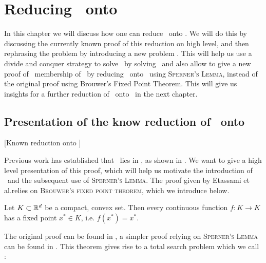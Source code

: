 \setchapterpreamble[u]{\margintoc}
\chapter{Reducing \Tarski\ onto \PPAD}

In this chapter we will discuss how one can reduce \Tarski\ onto \PPAD. We will do this by discussing the currently known proof of this reduction on high level, and then rephrasing the problem by introducing a new problem \Tarskistar. This will help us use a divide and conquer strategy to solve \Tarski\ by solving \Tarskistar\ and also allow to give a new proof of \PPAD\ membership of \Tarski\ by reducing \Tarskistar\ onto \PPAD\ using \textsc{Sperner's Lemma}, instead of the original proof using Brouwer's Fixed Point Theorem. This will give us insights for a further reduction of \Tarskistar\ onto \EOPL\ in the next chapter.

\section{Presentation of the know reduction of \Tarski\ onto \PPAD}[Known reduction onto \PPAD]

Previous work has established that \Tarski\ lies in \PPAD, as shown in . We want to give a high level presentation of this proof, which will help us motivate the introduction of \Tarskistar\ and the subsequent use of \textsc{Sperner's Lemma}. The proof given by Etassami et al.\@ relies on \textsc{Brouwer's fixed point theorem}, which we introduce below.

\begin{theorem}
    Let $K \subset \mathbb{R}^d$ be a compact, convex set. Then every continuous function $f : K \rightarrow K$ has a fixed point $x^*	\in K$, i.e. $f(x^*) = x^*$.
\end{theorem}

The original proof can be found in , a simpler proof relying on \textsc{Sperner's Lemma} can be found in . This theorem gives rise to a total search problem which we call \Brouwer:


